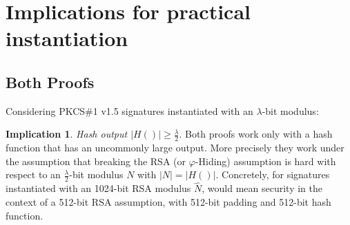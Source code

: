 \documentclass[]{final_report}
\theoremstyle{definition}
\newtheorem{implication}{Implication}
\begin{document}

\section{Implications for practical instantiation}

\subsection{Both Proofs}
Considering PKCS\#1 v1.5 signatures instantiated with an $\lambda$-bit modulus:
\begin{implication} \textit{Hash output $\displaystyle|H()| \ge \displaystyle\frac{\lambda}{2}$}.
Both proofs work only with a hash function that has an uncommonly large output. More precisely they work under the assumption that breaking the RSA (or $\varphi$-Hiding) assumption is hard with respect to an $\frac{\lambda}{2}$-bit modulus $N$ with $|N| = |H()|$. Concretely, for signatures instantiated with an 1024-bit RSA modulus $\displaystyle\hat{N}$, would mean security in the context of a 512-bit RSA assumption, with 512-bit padding and 512-bit hash function.
\end{implication}
\end{document}
